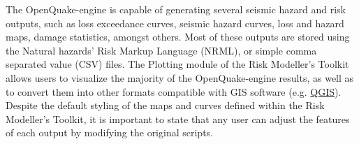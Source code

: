 The OpenQuake-engine is capable of generating several seismic hazard and risk outputs, such as loss exceedance curves, seismic hazard curves, loss and hazard maps, damage statistics, amongst others. Most of these outputs are stored using the Natural hazards' Risk Markup Language (NRML), or simple comma separated value (CSV) files. The Plotting module of the Risk Modeller's Toolkit allows users to visualize the majority of the OpenQuake-engine results, as well as to convert them into other formats compatible with GIS software (e.g. \href{http://www.qgis.org/}{QGIS}). Despite the default styling of the maps and curves defined within the Risk Modeller's Toolkit, it is important to state that any user can adjust the features of each output by modifying the original scripts.